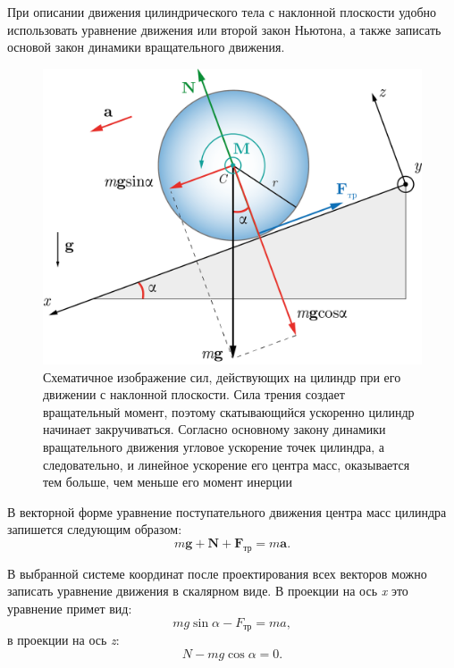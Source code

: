 \documentclass[14pt,a4paper,oneside]{extarticle}	%
\begin{document}
	При описании движения цилиндрического тела с наклонной плоскости удобно использовать уравнение движения или второй закон Ньютона, а также записать основой закон динамики вращательного движения.
	
	\begin{figure}[H] 	
		\centering 	
		\includegraphics[width=0.8\linewidth]{inclinedplane-3.png}
		\caption{Схематичное изображение сил, действующих на цилиндр при его движении с наклонной плоскости. Сила трения создает вращательный момент, поэтому скатывающийся ускоренно цилиндр начинает закручиваться. Согласно основному закону динамики вращательного движения угловое ускорение точек цилиндра, а следовательно, и линейное ускорение его центра масс, оказывается тем больше, чем меньше его момент инерции}
		\label{inclinedplane-3}
	\end{figure}

	В векторной форме уравнение поступательного движения центра масс цилиндра запишется следующим образом:
	\begin{equation}\label{inclinedplane-1eq1}
	m\textbf{g}+\textbf{N}+\textbf{F}_{\text{тр}} = m\textbf{a}.
	\end{equation} 
	
В выбранной системе координат после проектирования всех векторов можно записать уравнение движения в скалярном виде.
В проекции на ось  \textit{x}  это уравнение примет вид:
	\begin{equation}\label{inclinedplane-1eq2}
	mg\sin\alpha - F_{\text{тр}} = ma,
	\end{equation}
	в проекции на ось  \textit{z}:
	\begin{equation}\label{inclinedplane-1eq3}
	N - mg\cos\alpha = 0.
	\end{equation}
	
\end{document}
